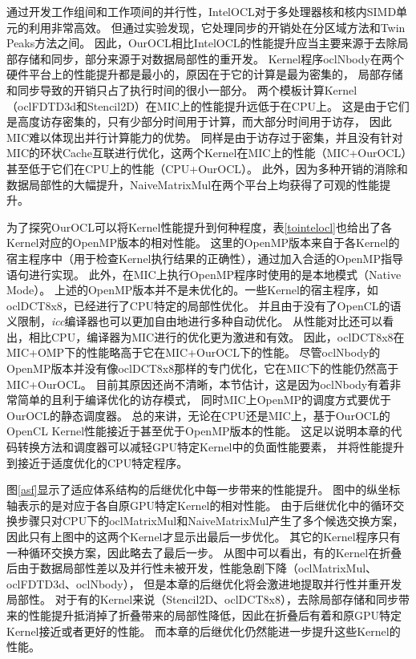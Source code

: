 通过开发工作组间和工作项间的并行性，IntelOCL对于多处理器核和核内SIMD单元的利用非常高效。
但通过实验发现，它处理同步的开销处在分区域方法和Twin Peaks方法之间。
因此，OurOCL相比IntelOCL的性能提升应当主要来源于去除局部存储和同步，部分来源于对数据局部性的重开发。
Kernel程序oclNbody在两个硬件平台上的性能提升都是最小的，原因在于它的计算是最为密集的，
局部存储和同步导致的开销只占了执行时间的很小一部分。
两个模板计算Kernel（oclFDTD3d和Stencil2D）在MIC上的性能提升远低于在CPU上。
这是由于它们是高度访存密集的，只有少部分时间用于计算，而大部分时间用于访存，
因此MIC难以体现出并行计算能力的优势。
同样是由于访存过于密集，并且没有针对MIC的环状Cache互联进行优化，这两个Kernel在MIC上的性能（MIC+OurOCL）甚至低于它们在CPU上的性能（CPU+OurOCL）。
此外，因为多种开销的消除和数据局部性的大幅提升，NaiveMatrixMul在两个平台上均获得了可观的性能提升。

为了探究OurOCL可以将Kernel性能提升到何种程度，表\ref{tointelocl}也给出了各Kernel对应的OpenMP版本的相对性能。
这里的OpenMP版本来自于各Kernel的宿主程序中（用于检查Kernel执行结果的正确性），通过加入合适的OpenMP指导语句进行实现。
此外，在MIC上执行OpenMP程序时使用的是本地模式（Native Mode）。
上述的OpenMP版本并不是未优化的。一些Kernel的宿主程序，如oclDCT8x8，已经进行了CPU特定的局部性优化。
并且由于没有了OpenCL的语义限制，{\em icc}编译器也可以更加自由地进行多种自动优化。
从性能对比还可以看出，相比CPU，编译器为MIC进行的优化更为激进和有效。
因此，oclDCT8x8在MIC+OMP下的性能略高于它在MIC+OurOCL下的性能。
尽管oclNbody的OpenMP版本并没有像oclDCT8x8那样的专门优化，它在MIC下的性能仍然高于MIC+OurOCL。
目前其原因还尚不清晰，本节估计，这是因为oclNbody有着非常简单的且利于编译优化的访存模式，
同时MIC上OpenMP的调度方式要优于OurOCL的静态调度器。
总的来讲，无论在CPU还是MIC上，基于OurOCL的OpenCL Kernel性能接近于甚至优于OpenMP版本的性能。
这足以说明本章的代码转换方法和调度器可以减轻GPU特定Kernel中的负面性能要素，
并将性能提升到接近于适度优化的CPU特定程序。

图\ref{asf}显示了适应体系结构的后继优化中每一步带来的性能提升。
图中的纵坐标轴表示的是对应于各自原GPU特定Kernel的相对性能。
由于后继优化中的循环交换步骤只对CPU下的oclMatrixMul和NaiveMatrixMul产生了多个候选交换方案，
因此只有上图中的这两个Kernel才显示出最后一步优化。
其它的Kernel程序只有一种循环交换方案，因此略去了最后一步。
从图中可以看出，有的Kernel在折叠后由于数据局部性差以及并行性未被开发，性能急剧下降（oclMatrixMul、oclFDTD3d、oclNbody），
但是本章的后继优化将会激进地提取并行性并重开发局部性。
对于有的Kernel来说（Stencil2D、oclDCT8x8），去除局部存储和同步带来的性能提升抵消掉了折叠带来的局部性降低，因此在折叠后有着和原GPU特定Kernel接近或者更好的性能。
而本章的后继优化仍然能进一步提升这些Kernel的性能。

